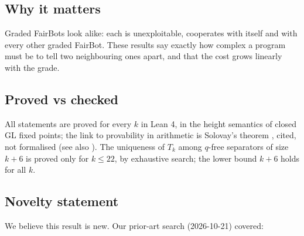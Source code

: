 \documentclass{article}
\begin{document}
\subsection*{Why it matters}

Graded FairBots look alike: each is unexploitable, cooperates with itself and with every other
graded FairBot. These results say exactly how complex a program must be to tell two neighbouring
ones apart, and that the cost grows linearly with the grade.

\subsection*{Proved vs checked}

All statements are proved for every $k$ in Lean 4, in the height semantics of closed GL fixed
points; the link to provability in arithmetic is Solovay's theorem \cite{solovay1976provability},
cited, not formalised (see also \cite{boolos1993logic}). The uniqueness of $T_k$ among $q$-free
separators of size $k+6$ is proved only for $k \le 22$, by exhaustive search; the lower bound
$k+6$ holds for all $k$.

\subsection*{Novelty statement}

We believe this result is new. Our prior-art search (2026-10-21) covered:
\end{document}
